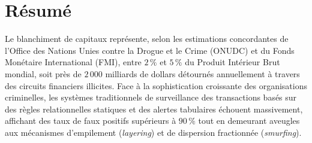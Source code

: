 
\chapter*{Résumé}

Le blanchiment de capitaux représente, selon les estimations concordantes de l'Office des Nations Unies contre la Drogue et le Crime (ONUDC) et du Fonds Monétaire International (FMI), entre $2\,\%$ et $5\,\%$ du Produit Intérieur Brut mondial, soit près de $2\,000$ milliards de dollars détournés annuellement à travers des circuits financiers illicites. Face à la sophistication croissante des organisations criminelles, les systèmes traditionnels de surveillance des transactions basés sur des règles relationnelles statiques et des alertes tabulaires échouent massivement, affichant des taux de faux positifs supérieurs à $90\,\%$ tout en demeurant aveugles aux mécanismes d'empilement (\textit{layering}) et de dispersion fractionnée (\textit{smurfing}).

